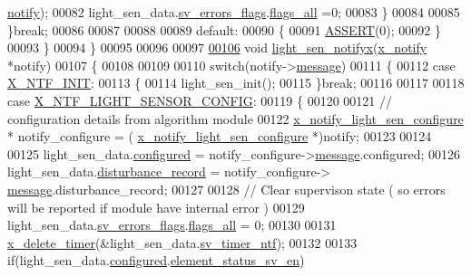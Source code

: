 \begin{DoxyCode}
      \hyperlink{a00018_a8e6a04c2283f9fd7b8dcbc62faba5847}{notify});
00082              light\_sen\_data.\hyperlink{a00024_aaeec6b0609dba31393f337abf1cce3d3}{sv\_errors\_flags}.\hyperlink{a00022_a1caa87b00c878186140c3bac9c8acf3b}{flags\_all} =0;
00083             \}
00084             
00085         \}\textcolor{keywordflow}{break};
00086       
00087 
00088         
00089         \textcolor{keywordflow}{default}:
00090         \{
00091             \hyperlink{a00072_abb8ff8e213ac9f6fb21d2b968583b936}{ASSERT}(0);
00092         \}        
00093     \}
00094 \}
00095 
00096 
00097 
\hypertarget{a00047_source_l00106}{}\hyperlink{a00047_a317b03892739257278fd51ab8003962d}{00106} \textcolor{keywordtype}{void} \hyperlink{a00047_a317b03892739257278fd51ab8003962d}{light\_sen\_notifyx}(\hyperlink{a00036_df/d4c/a00851}{x\_notify} *notify)
00107 \{
00108 
00109     
00110     \textcolor{keywordflow}{switch}(notify->\hyperlink{a00036_adf9665938515a20c283eea2c978cf80d}{message})
00111     \{    
00112         \textcolor{keywordflow}{case} \hyperlink{a00036_a620b808f2d7b8d2a03c4d026a4c5423c}{X\_NTF\_INIT}:
00113         \{
00114             light\_sen\_init();
00115         \}\textcolor{keywordflow}{break};
00116 
00117 
00118         \textcolor{keywordflow}{case} \hyperlink{a00018_ac8c3accc8173c965137b300542e451e6}{X\_NTF\_LIGHT\_SENSOR\_CONFIG}:
00119         \{
00120 
00121             \textcolor{comment}{// configuration details from algorithm module}
00122             \hyperlink{a00018_da/de3/a00856}{x\_notify\_light\_sen\_configure} * notify\_configure = (
      \hyperlink{a00018_da/de3/a00856}{x\_notify\_light\_sen\_configure} *)notify;
00123 
00124            
00125             light\_sen\_data.\hyperlink{a00024_a94b2d1f6ea4ab334c74d24984dd27843}{configured} = notify\_configure->\hyperlink{a00018_a32952acc732e2f16aad59fe0804da5bf}{message}.configured;
00126             light\_sen\_data.\hyperlink{a00024_ac9b38e2c1d3f1013a88d33506c754152}{disturbance\_record} = notify\_configure->
      \hyperlink{a00018_a32952acc732e2f16aad59fe0804da5bf}{message}.disturbance\_record;
00127 
00128             \textcolor{comment}{// Clear supervison state ( so errors will be reported if module have internal error )}
00129              light\_sen\_data.\hyperlink{a00024_aaeec6b0609dba31393f337abf1cce3d3}{sv\_errors\_flags}.\hyperlink{a00022_a1caa87b00c878186140c3bac9c8acf3b}{flags\_all} = 0;
00130 
00131           \hyperlink{a00036_ab69e9af4cfa717e870d587906283635c}{x\_delete\_timer}(&light\_sen\_data.\hyperlink{a00024_ada91b200053f2d93e3639dc4ee3415b4}{sv\_timer\_ntf});
00132 
00133           \textcolor{keywordflow}{if}(light\_sen\_data.\hyperlink{a00024_a94b2d1f6ea4ab334c74d24984dd27843}{configured}.\hyperlink{a00021_afeb3f74725269028a60926f98890c22b}{element\_status\_sv\_en})

\end{DoxyCode}
